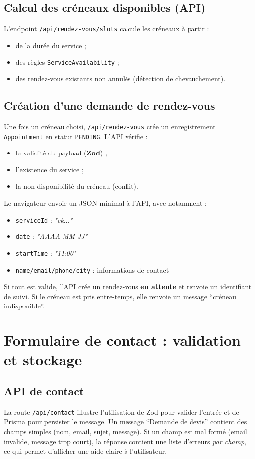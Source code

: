 \subsection{Calcul des créneaux disponibles (API)}
L’endpoint \texttt{/api/rendez-vous/slots} calcule les créneaux à partir :
\begin{itemize}
    \item de la durée du service ;
    \item des règles \texttt{ServiceAvailability} ;
    \item des rendez-vous existants non annulés (détection de chevauchement).
\end{itemize}

\subsection{Création d’une demande de rendez-vous}
Une fois un créneau choisi, \texttt{/api/rendez-vous} crée un enregistrement \texttt{Appointment} en statut \texttt{PENDING}. L’API vérifie :
\begin{itemize}
    \item la validité du payload (\textbf{Zod}) ;
    \item l’existence du service ;
    \item la non-disponibilité du créneau (conflit).
\end{itemize}

Le navigateur envoie un JSON minimal à l’API, avec notamment :
\begin{itemize}
    \item \texttt{serviceId} : \textit{"ck..."}
    \item \texttt{date} : \textit{"AAAA-MM-JJ"}
    \item \texttt{startTime} : \textit{"11:00"}
    \item \texttt{name/email/phone/city} : informations de contact
\end{itemize}
Si tout est valide, l’API crée un rendez-vous \textbf{en attente} et renvoie un identifiant de suivi. Si le créneau est pris entre-temps, elle renvoie un message “créneau indisponible”.

\section{Formulaire de contact : validation et stockage}

\subsection{API de contact}
La route \texttt{/api/contact} illustre l’utilisation de Zod pour valider l’entrée et de Prisma pour persister le message.
Un message “Demande de devis” contient des champs simples (nom, email, sujet, message). Si un champ est mal formé (email invalide, message trop court), la réponse contient une liste d’erreurs \textit{par champ}, ce qui permet d’afficher une aide claire à l’utilisateur.

